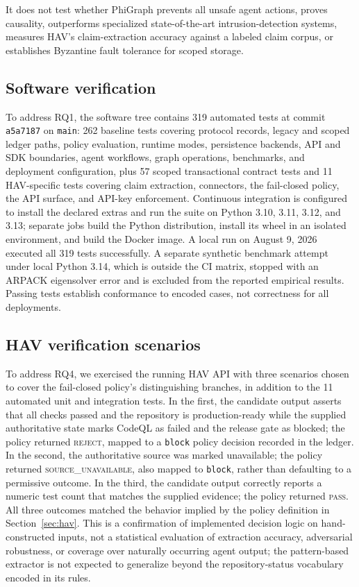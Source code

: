 \documentclass[11pt]{article}
\begin{document}
It does not test whether PhiGraph prevents all unsafe agent actions, proves
causality, outperforms specialized state-of-the-art intrusion-detection
systems, measures HAV's claim-extraction accuracy against a labeled claim
corpus, or establishes Byzantine fault tolerance for scoped storage.

\subsection{Software verification}

To address RQ1, the software tree contains 319 automated tests at commit
\texttt{a5a7187} on
\texttt{main}: 262 baseline tests covering protocol records, legacy and scoped
ledger paths, policy evaluation, runtime modes, persistence backends, API and
SDK boundaries, agent workflows, graph operations, benchmarks, and deployment
configuration, plus 57 scoped transactional contract tests and 11 HAV-specific
tests covering claim extraction, connectors, the fail-closed policy, the API
surface, and API-key enforcement. Continuous integration is configured to
install the declared extras and run the suite on Python 3.10, 3.11, 3.12, and
3.13; separate jobs build the Python distribution, install its wheel in an
isolated environment, and build the Docker image. A local run on August 9, 2026
executed all 319 tests successfully. A separate synthetic benchmark attempt
under local Python 3.14, which is outside the CI matrix, stopped with an
ARPACK eigensolver error and is excluded from the reported empirical results.
Passing tests establish conformance to encoded cases, not correctness for all
deployments.

\subsection{HAV verification scenarios}
\label{sec:hav-scenarios}

To address RQ4, we exercised the running HAV API with three scenarios chosen
to cover the fail-closed policy's distinguishing branches, in addition to the
11 automated unit and integration tests. In the first, the candidate output
asserts that all checks passed and the repository is production-ready while
the supplied authoritative state marks CodeQL as failed and the release gate
as blocked; the policy returned \textsc{reject}, mapped to a \texttt{block}
policy decision recorded in the ledger. In the second, the authoritative
source was marked unavailable; the policy returned
\textsc{source\_unavailable}, also mapped to \texttt{block}, rather than
defaulting to a permissive outcome. In the third, the candidate output
correctly reports a numeric test count that matches the supplied evidence; the
policy returned \textsc{pass}. All three outcomes matched the behavior implied
by the policy definition in Section~\ref{sec:hav}. This is a confirmation of
implemented decision logic on hand-constructed inputs, not a statistical
evaluation of extraction accuracy, adversarial robustness, or coverage over
naturally occurring agent output; the pattern-based extractor is not expected
to generalize beyond the repository-status vocabulary encoded in its rules.
\end{document}
